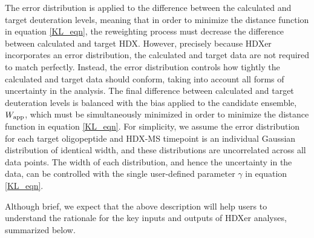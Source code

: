 \documentclass[9pt,tutorial]{livecoms}
\begin{document}
The error distribution is applied to the difference between the calculated and target deuteration levels, meaning that in order to minimize the distance function in equation \ref{KL_eqn}, the reweighting process must decrease the difference between calculated and target HDX.
However, precisely because HDXer incorporates an error distribution, the calculated and target data are not required to match perfectly.
Instead, the error distribution controls how tightly the calculated and target data should conform, taking into account all forms of uncertainty in the analysis.
The final difference between calculated and target deuteration levels is balanced with the bias applied to the candidate ensemble, $W_\textnormal{app}$, which must be simultaneously minimized in order to minimize the distance function in equation \ref{KL_eqn}. 
For simplicity, we assume the error distribution for each target oligopeptide and HDX-MS timepoint is an individual Gaussian distribution of identical width, and these distributions are uncorrelated across all data points.
The width of each distribution, and hence the uncertainty in the data, can be controlled with the single user-defined parameter $\gamma$ in equation \ref{KL_eqn}.

Although brief, we expect that the above description will help users to understand the rationale for the key inputs and outputs of HDXer analyses, summarized below.
\end{document}
